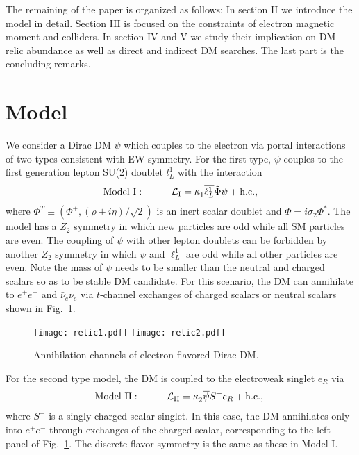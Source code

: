 \documentclass[aps,prd,letterpaper,showpacs,twocolumn,preprintnumbers,floatfix,superscriptaddress]{revtex4-1}
\begin{document}
The remaining of the paper is organized as follows: In section II we introduce the model in detail. Section III is focused on the constraints of electron magnetic moment and colliders. In section IV and V we study their implication on DM relic abundance as well as direct and indirect DM searches. The last part is the concluding remarks.
 
\section{\label{sec:model}Model}
%
We consider a Dirac DM $\psi$ which couples to the electron via portal interactions of 
two types consistent with EW symmetry. 
%
For the first type, $\psi$ couples to the first generation  lepton SU(2) doublet $l_L^1$ with the interaction 
%
\begin{eqnarray}
  \text{Model I}: \quad \quad -  \mathcal{L}_{\text{I}} = \kappa_1^{}  \overline {{\ell^1_L}} \tilde \Phi \psi + {\rm h.c.}  ,
\end{eqnarray}
%
where $\Phi^T\equiv(\Phi^+, (\rho + i \eta)/\sqrt{2})$ is an inert scalar doublet and 
$\tilde{\Phi} = i \sigma_2 \Phi^{\ast}$. 
%
The model has a $Z_2$ symmetry in which new particles are odd while all SM particles are even. 
%
The coupling of $\psi$ with other lepton doublets can be forbidden by another $Z_2$ symmetry in which $\psi$ and $\ell_L^1$ are odd while all other particles are even. 
%
Note the mass of $\psi$ needs to be smaller than the neutral and charged scalars so as to be stable DM candidate.
%
For this scenario, the DM can annihilate to $e^+ e^-$ and $\bar{\nu}_{e} \nu_e$ via $t$-channel exchanges of 
charged scalars or neutral scalars shown in Fig.~\ref{fig:relic}.
%
%
\begin{figure}[t]
\centering
   \texttt{[image: relic1.pdf]}
   \hspace{0.5cm}
   \texttt{[image: relic2.pdf]}
 \caption{\label{fig:relic} Annihilation channels of electron flavored Dirac DM.}
 \end{figure}
%

For the second type model, the DM is coupled to the electroweak singlet $e_R$ via
\begin{eqnarray}
  \text{Model II}: \quad \quad -  \mathcal{L}_{\text{II}} = \kappa_2^{} \overline \psi S^+ {e_R}  + {\rm h.c.}  ,\;
\end{eqnarray}
where $S^+$ is a singly charged scalar singlet. In this case, the DM annihilates only into $e^+ e^-$ through 
exchanges of the charged scalar, corresponding to the left panel of Fig.~\ref{fig:relic}. 
%
The discrete flavor symmetry is the same as these in Model I.
\end{document}
